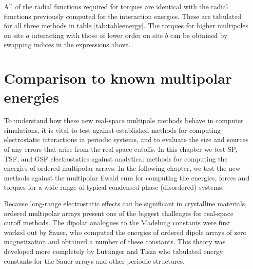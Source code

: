 All of the radial functions required for torques are identical with
the radial functions previously computed for the interaction energies.
These are tabulated for all three methods in table
\ref{tab:tableenergy}.  The torques for higher multipoles on site
$a$ interacting with those of lower order on site
$b$ can be obtained by swapping indices in the expressions
above.
\section{Comparison to known multipolar energies}

To understand how these new real-space multipole methods behave in
computer simulations, it is vital to test against established methods
for computing electrostatic interactions in periodic systems, and to
evaluate the size and sources of any errors that arise from the
real-space cutoffs. In this chapter we test SP, TSF, and GSF
electrostatics against analytical methods for computing the energies
of ordered multipolar arrays.  In the following chapter, we test the new
methods against the multipolar Ewald sum for computing the energies,
forces and torques for a wide range of typical condensed-phase
(disordered) systems.

Because long-range electrostatic effects can be significant in
crystalline materials, ordered multipolar arrays present one of the
biggest challenges for real-space cutoff methods.  The dipolar
analogues to the Madelung constants were first worked out by Sauer,
who computed the energies of ordered dipole arrays of zero
magnetization and obtained a number of these constants.\cite{Sauer}
This theory was developed more completely by Luttinger and
Tisza\cite{LT,LT2} who tabulated energy constants for the Sauer arrays
and other periodic structures.  

